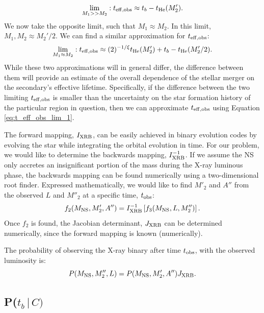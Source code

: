 \documentclass[12pt, preprint]{aastex}
\newcommand{\given}{\,|\,}
\begin{document}
\begin{equation}
\lim_{M_1 >> M_2}:  t_{\rm eff,obs} \approx t_b - t_{\rm He}(M_2'). \label{eq:t_eff_obs_lim_1}
\end{equation}
We now take the opposite limit, such that $M_1 \approx M_2$. In this limit, $M_1, M_2 \approx M_2'/2$. We can find a similar approximation for $t_{\rm eff,obs}$:
\begin{equation}
\lim_{M_1 \approx M_2}: t_{\rm eff,obs} \approx (2)^{-1/\xi}  t_{\rm He} (M_2') + t_b - t_{\rm He} (M_2'/2).
\end{equation}
While these two approximations will in general differ, the difference between them will provide an estimate of the overall dependence of the stellar merger on the secondary's effective lifetime. Specifically, if the difference between the two limiting $t_{\rm eff,obs}$ is smaller than the uncertainty on the star formation history of the particular region in question, then we can approximate $t_{\rm eff,obs}$ using Equation \ref{eq:t_eff_obs_lim_1}.


The forward mapping, $I_{\rm XRB}$, can be easily achieved in binary evolution codes by evolving the star while integrating the orbital evolution in time. For our problem, we would like to determine the backwards mapping, $I^{-1}_{\rm XRB}$. If we assume the NS only accretes an insignificant portion of the mass during the X-ray luminous phase, the backwards mapping can be found numerically using a two-dimensional root finder. Expressed mathematically, we would like to find $M'_2$ and $A''$ from the observed $L$ and $M''_2$ at a specific time, $t_{\rm obs}$:
\begin{equation}
f_2(M_{\rm NS}, M'_2, A'') = I^{-1}_{\rm XRB} \left[ f_3(M_{\rm NS}, L, M''_2) \right].
\end{equation}
Once $f_2$ is found, the Jacobian determinant, $J_{\rm XRB}$ can be determined numerically, since the forward mapping is known (numerically).

The probability of observing the X-ray binary after time $t_{\rm obs}$, with the observed luminosity is:
\begin{equation}
P(M_{\rm NS}, M''_2, L) = P(M_{\rm NS}, M'_2, A'') J_{\rm XRB}. \label{eq:P_XRB}
\end{equation}



\subsection{P($t_b \given C)$}
\end{document}
